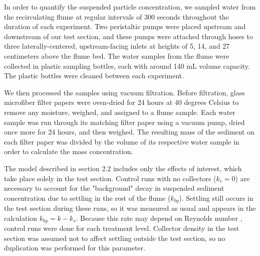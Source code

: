 \documentclass{scrreprt}
\begin{document}
In order to quantify the suspended particle concentration, we sampled water from the recirculating flume at regular intervals of 300 seconds throughout the duration of each experiment. Two peristaltic pumps were placed upstream and downstream of our test section, and these pumps were attached through hoses to three laterally-centered, upstream-facing inlets at heights of 5, 14, and 27 centimeters above the flume bed. The water samples from the flume were collected in plastic sampling bottles, each with around 140 mL volume capacity. The plastic bottles were cleaned between each experiment. 

We then processed the samples using vacuum filtration. Before filtration, glass microfiber filter papers were oven-dried for 24 hours at 40 degrees Celsius to remove any moisture, weighed, and assigned to a flume sample. Each water sample was run through its matching filter paper using a vacuum pump, dried once more for 24 hours, and then weighed. The resulting mass of the sediment on each filter paper was divided by the volume of its respective water sample in order to calculate the mass concentration.

The model described in section 2.2 includes only the effects of interest, which take place solely in the test section. Control runs with no collectors ($k_c = 0$) are necessary to account for the "background" decay in suspended sediment concentration due to settling in the rest of the flume ($k_{bg}$). Settling still occurs in the test section during these runs, so it was measured as usual and appears in the calculation $k_{bg} = k - k_s$. Because this rate may depend on Reynolds number \citep{Nielsen_1993, Jacobs_2016, Wang_2018}, control runs were done for each treatment level. Collector density in the test section was assumed not to affect settling outside the test section, so no duplication was performed for this parameter.

\end{document}
